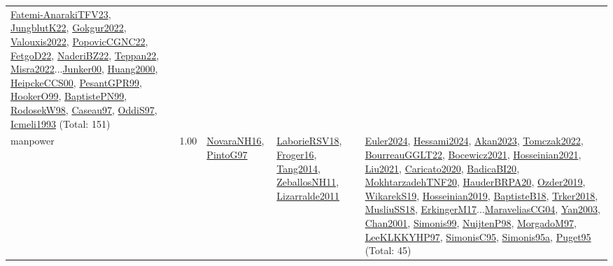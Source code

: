 {\begin{longtable}{p{3cm}r>{\raggedright\arraybackslash}p{6cm}>{\raggedright\arraybackslash}p{6cm}>{\raggedright\arraybackslash}p{8cm}}
\hyperref[detail:Fatemi-AnarakiTFV23]{Fatemi-AnarakiTFV23}, \hyperref[detail:JungblutK22]{JungblutK22}, \hyperref[detail:Gokgur2022]{Gokgur2022}, \hyperref[detail:Valouxis2022]{Valouxis2022}, \hyperref[detail:PopovicCGNC22]{PopovicCGNC22}, \hyperref[detail:FetgoD22]{FetgoD22}, \hyperref[detail:NaderiBZ22]{NaderiBZ22}, \hyperref[detail:Teppan22]{Teppan22}, \hyperref[detail:Misra2022]{Misra2022}...\hyperref[detail:Junker00]{Junker00}, \hyperref[detail:Huang2000]{Huang2000}, \hyperref[detail:HeipckeCCS00]{HeipckeCCS00}, \hyperref[detail:PesantGPR99]{PesantGPR99}, \hyperref[detail:HookerO99]{HookerO99}, \hyperref[detail:BaptistePN99]{BaptistePN99}, \hyperref[detail:RodosekW98]{RodosekW98}, \hyperref[detail:Caseau97]{Caseau97}, \hyperref[detail:OddiS97]{OddiS97}, \hyperref[detail:Icmeli1993]{Icmeli1993} (Total: 151)\\
\index{manpower}\index{Concepts!manpower}manpower &  1.00 & \hyperref[detail:NovaraNH16]{NovaraNH16}, \hyperref[detail:PintoG97]{PintoG97} & \hyperref[detail:LaborieRSV18]{LaborieRSV18}, \hyperref[detail:Froger16]{Froger16}, \hyperref[detail:Tang2014]{Tang2014}, \hyperref[detail:ZeballosNH11]{ZeballosNH11}, \hyperref[detail:Lizarralde2011]{Lizarralde2011} & \hyperref[detail:Euler2024]{Euler2024}, \hyperref[detail:Hessami2024]{Hessami2024}, \hyperref[detail:Akan2023]{Akan2023}, \hyperref[detail:Tomczak2022]{Tomczak2022}, \hyperref[detail:BourreauGGLT22]{BourreauGGLT22}, \hyperref[detail:Bocewicz2021]{Bocewicz2021}, \hyperref[detail:Hosseinian2021]{Hosseinian2021}, \hyperref[detail:Liu2021]{Liu2021}, \hyperref[detail:Caricato2020]{Caricato2020}, \hyperref[detail:BadicaBI20]{BadicaBI20}, \hyperref[detail:MokhtarzadehTNF20]{MokhtarzadehTNF20}, \hyperref[detail:HauderBRPA20]{HauderBRPA20}, \hyperref[detail:Ozder2019]{Ozder2019}, \hyperref[detail:WikarekS19]{WikarekS19}, \hyperref[detail:Hosseinian2019]{Hosseinian2019}, \hyperref[detail:BaptisteB18]{BaptisteB18}, \hyperref[detail:Trker2018]{Trker2018}, \hyperref[detail:MusliuSS18]{MusliuSS18}, \hyperref[detail:ErkingerM17]{ErkingerM17}...\hyperref[detail:MaraveliasCG04]{MaraveliasCG04}, \hyperref[detail:Yan2003]{Yan2003}, \hyperref[detail:Chan2001]{Chan2001}, \hyperref[detail:Simonis99]{Simonis99}, \hyperref[detail:NuijtenP98]{NuijtenP98}, \hyperref[detail:MorgadoM97]{MorgadoM97}, \hyperref[detail:LeeKLKKYHP97]{LeeKLKKYHP97}, \hyperref[detail:SimonisC95]{SimonisC95}, \hyperref[detail:Simonis95a]{Simonis95a}, \hyperref[detail:Puget95]{Puget95} (Total: 45)\\

\end{longtable}}
